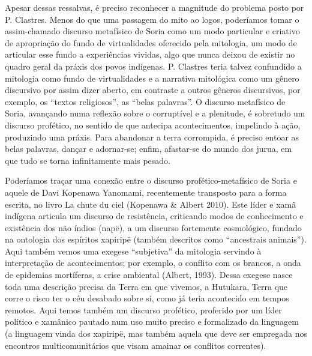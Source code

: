\documentclass{article}
\begin{document}
Apesar dessas ressalvas, \'e preciso reconhecer a magnitude do problema
posto por P. Clastres. Menos do que uma passagem do mito ao logos,
poder\'iamos tomar o assim-chamado discurso metaf\'isico de Soria como
um modo particular e criativo de apropria\c{c}\~ao do fundo de
virtualidades oferecido pela mitologia, um modo de articular esse fundo
a experi\^encias vividas, algo que nunca deixou de existir no quadro
geral da pr\'axis dos povos ind\'igenas. P. Clastres teria talvez
confundido a mitologia como fundo de virtualidades e a narrativa
mitol\'ogica como um g\^enero discursivo por assim dizer aberto, em
contraste a outros g\^eneros discursivos, por exemplo, os
{\textquotedblleft}textos religiosos{\textquotedblright}, as
{\textquotedblleft}belas palavras{\textquotedblright}. O discurso
metaf\'isico de Soria, avan\c{c}ando numa reflex\~ao sobre o
corrupt\'ivel e a plenitude, \'e sobretudo um discurso prof\'etico, no
sentido de que antecipa acontecimentos, impelindo \`a a\c{c}\~ao,
produzindo uma pr\'axis. Para abandonar a terra corrompida, \'e preciso
entoar as belas palavras, dan\c{c}ar e adornar-se; enfim, afastar-se do
mundo dos jurua, em que tudo se torna infinitamente mais pesado. 

Poder\'iamos tra\c{c}ar uma conex\~ao entre o discurso
prof\'etico-metaf\'isico de Soria e aquele de Davi Kopenawa Yanomami,
recentemente transposto para a forma escrita, no livro La chute du ciel
(Kopenawa \& Albert 2010). Este l\'ider e xam\~a ind\'igena articula um
discurso de resist\^encia, criticando modos de conhecimento e
exist\^encia dos n\~ao \'indios (nap\"e), a um discurso fortemente
cosmol\'ogico, fundado na ontologia dos esp\'iritos xapirip\"e
(tamb\'em descritos como {\textquotedblleft}ancestrais
animais{\textquotedblright}). Aqui tamb\'em vemos uma exegese
{\textquotedblleft}subjetiva{\textquotedblright} da mitologia servindo
\`a interpreta\c{c}\~ao de acontecimentos; por exemplo, o conflito com
os brancos, a onda de epidemias mort\'iferas, a crise ambiental
(Albert, 1993). Dessa exegese nasce toda uma descri\c{c}\~ao precisa da
Terra em que vivemos, a Hutukara, Terra que corre o risco ter o c\'eu
desabado sobre si, como j\'a teria acontecido em tempos remotos. Aqui
temos tamb\'em um discurso prof\'etico, proferido por um l\'ider
pol\'itico e xam\^anico pautado num uso muito preciso e formalizado da
linguagem (a linguagem vinda dos xapirip\"e, mas tamb\'em aquela que
deve ser empregada nos encontros multicomunit\'arios que visam amainar
os conflitos correntes). 
\end{document}
